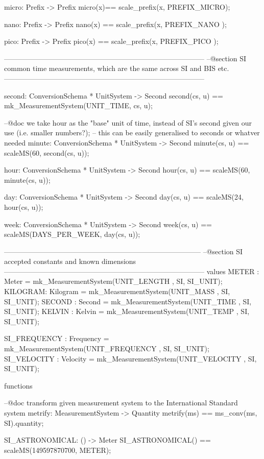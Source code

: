 \documentclass[a4paper]{article}
\begin{document}
\begin{vdm_al}
 micro: Prefix -> Prefix
 micro(x)== scale_prefix(x, PREFIX_MICRO);

 nano: Prefix -> Prefix
 nano(x) == scale_prefix(x, PREFIX_NANO );

 pico: Prefix -> Prefix
 pico(x) == scale_prefix(x, PREFIX_PICO ); 
 
------------------------------------------------------------------------------------
--@section SI common time measurements, which are the same across SI and BIS etc.
------------------------------------------------------------------------------------

 second: ConversionSchema * UnitSystem -> Second
 second(cs, u) == mk_MeasurementSystem(UNIT_TIME, cs, u);
 
 --@doc we take hour as the "base" unit of time, instead of SI's second given our use (i.e. smaller numbers?);
 --   this can be easily generalised to seconds or whatver needed 
 minute: ConversionSchema * UnitSystem -> Second
 minute(cs, u) == scaleMS(60, second(cs, u));
 
 hour: ConversionSchema * UnitSystem -> Second 
 hour(cs, u) == scaleMS(60, minute(cs, u));
 
 day: ConversionSchema * UnitSystem -> Second 
 day(cs, u) == scaleMS(24, hour(cs, u));
 
 week: ConversionSchema * UnitSystem -> Second
 week(cs, u) == scaleMS(DAYS_PER_WEEK, day(cs, u));
  
-----------------------------------------------------------------------------------
--@section SI accepted constants and known dimensions
------------------------------------------------------------------------------------
values
 METER   : Meter    = mk_MeasurementSystem(UNIT_LENGTH   , SI, SI_UNIT);
 KILOGRAM: Kilogram = mk_MeasurementSystem(UNIT_MASS     , SI, SI_UNIT);
 SECOND : Second   = mk_MeasurementSystem(UNIT_TIME     , SI, SI_UNIT); 
 KELVIN  : Kelvin   = mk_MeasurementSystem(UNIT_TEMP     , SI, SI_UNIT); 
        
 SI_FREQUENCY   : Frequency    = mk_MeasurementSystem(UNIT_FREQUENCY         , SI, SI_UNIT);
 SI_VELOCITY    : Velocity     = mk_MeasurementSystem(UNIT_VELOCITY          , SI, SI_UNIT);
 
functions
 
 --@doc transform given measurement system to the International Standard system     
 metrify: MeasurementSystem -> Quantity
 metrify(ms) == ms_conv(ms, SI).quantity;
 
 SI_ASTRONOMICAL: () -> Meter
 SI_ASTRONOMICAL() == scaleMS(149597870700, METER); 
 

\end{vdm_al}
\end{document}
